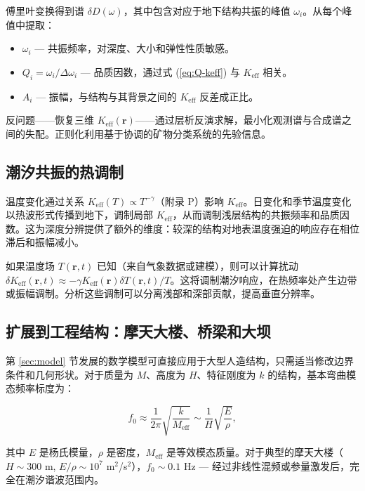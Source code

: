 \documentclass[12pt,a4paper]{article}
\theoremstyle{remark}
\newcommand{\Keff}{K_{\mathrm{eff}}}
\begin{document}
	傅里叶变换得到谱 $\delta D(\omega)$，其中包含对应于地下结构共振的峰值 $\omega_i$。从每个峰值中提取：
	
	\begin{itemize}
		\item $\omega_i$ — 共振频率，对深度、大小和弹性性质敏感。
		\item $Q_i = \omega_i / \Delta \omega_i$ — 品质因数，通过式 (\ref{eq:Q-keff}) 与 $\Keff$ 相关。
		\item $A_i$ — 振幅，与结构与其背景之间的 $\Keff$ 反差成正比。
	\end{itemize}
	
	反问题——恢复三维 $\Keff(\mathbf{r})$——通过层析反演求解，最小化观测谱与合成谱之间的失配。正则化利用基于协调的矿物分类系统的先验信息。
	
	\subsection{潮汐共振的热调制}
	\label{sec:thermal-modulation}
	
	温度变化通过关系 $\Keff(T) \propto T^{-\gamma}$（附录 P）影响 $\Keff$。日变化和季节温度变化以热波形式传播到地下，调制局部 $\Keff$，从而调制浅层结构的共振频率和品质因数。这为深度分辨提供了额外的维度：较深的结构对地表温度强迫的响应存在相位滞后和振幅减小。
	
	如果温度场 $T(\mathbf{r},t)$ 已知（来自气象数据或建模），则可以计算扰动 $\delta \Keff(\mathbf{r},t) \approx -\gamma \Keff(\mathbf{r}) \delta T(\mathbf{r},t)/T$。这将调制潮汐响应，在热频率处产生边带或振幅调制。分析这些调制可以分离浅部和深部贡献，提高垂直分辨率。
	
	\subsection{扩展到工程结构：摩天大楼、桥梁和大坝}
	\label{sec:structures}
	
	第 \ref{sec:model} 节发展的数学模型可直接应用于大型人造结构，只需适当修改边界条件和几何形状。对于质量为 \(M\)、高度为 \(H\)、特征刚度为 \(k\) 的结构，基本弯曲模态频率标度为：
	
	\begin{equation}
		f_0 \approx \frac{1}{2\pi} \sqrt{\frac{k}{M_{\mathrm{eff}}}} \sim \frac{1}{H} \sqrt{\frac{E}{\rho}},
		\label{eq:structural-frequency}
	\end{equation}
	
	其中 \(E\) 是杨氏模量，\(\rho\) 是密度，\(M_{\mathrm{eff}}\) 是等效模态质量。对于典型的摩天大楼（\(H \sim 300\) m, \(E/\rho \sim 10^7\) m\(^2\)/s\(^2\)），\(f_0 \sim 0.1\) Hz — 经过非线性混频或参量激发后，完全在潮汐谐波范围内。
	
\end{document}
